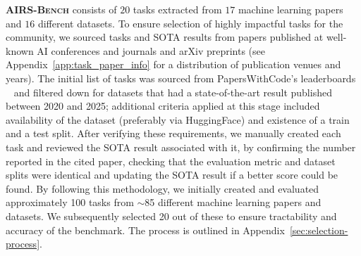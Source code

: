 \documentclass{fairmeta}
\newcommand{\bench}[1]{\textbf{#1}}
\newcommand{\airsbench}{\textsc{AIRS-Bench}}
\begin{document}
\bench{\airsbench} consists of $20$ tasks extracted from $17$ machine learning papers and $16$ different datasets. To ensure selection of highly impactful tasks for the community, we sourced tasks and SOTA results from papers published at well-known AI conferences and journals and arXiv preprints
(see Appendix~\ref{app:task_paper_info} for a distribution of publication venues and years). The initial list of tasks was sourced from PapersWithCode's leaderboards ~\citep{PapersWithCode, kardas2020axcellautomaticextractionresults} and filtered down for datasets that had a state-of-the-art result published between 2020 and 2025; additional criteria applied at this stage included availability of the dataset (preferably via HuggingFace) and existence of a train and a test split. After verifying these requirements, we manually created each task and reviewed the SOTA result associated with it, by confirming the number reported in the cited paper, checking that the evaluation metric and dataset splits were identical and updating the SOTA result if a better score could be found. By following this methodology, we initially created and evaluated approximately 100 tasks from $\sim$85 different machine learning papers and datasets. We subsequently selected 20 out of these to ensure tractability and accuracy of the benchmark. The process is outlined in Appendix~\ref{sec:selection-process}.







\end{document}
